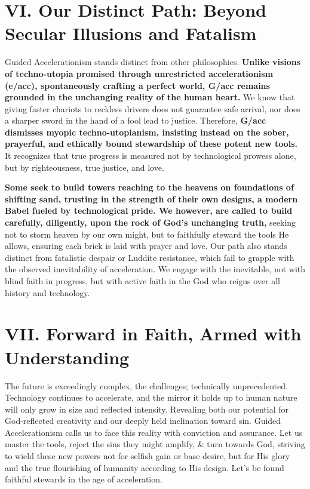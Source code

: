 \documentclass[11pt]{article}
\begin{document}
\section*{VI. Our Distinct Path: Beyond Secular Illusions and Fatalism}

Guided Accelerationism stands distinct from other philosophies. \textbf{Unlike visions of techno-utopia promised through unrestricted accelerationism (e/acc), spontaneously crafting a perfect world, G/acc remains grounded in the unchanging reality of the human heart.} We know that giving faster chariots to reckless drivers does not guarantee safe arrival, nor does a sharper sword in the hand of a fool lead to justice. Therefore, \textbf{G/acc dismisses myopic techno-utopianism, insisting instead on the sober, prayerful, and ethically bound stewardship of these potent new tools.} It recognizes that true progress is measured not by technological prowess alone, but by righteousness, true justice, and love.

\textbf{Some seek to build towers reaching to the heavens on foundations of shifting sand, trusting in the strength of their own designs, a modern Babel fueled by technological pride. We however, are called to build carefully, diligently, upon the rock of God's unchanging truth,} seeking not to storm heaven by our own might, but to faithfully steward the tools He allows, ensuring each brick is laid with prayer and love. Our path also stands distinct from fatalistic despair or Luddite resistance, which fail to grapple with the observed inevitability of acceleration. We engage with the inevitable, not with blind faith in progress, but with active faith in the God who reigns over all history and technology.

\section*{VII. Forward in Faith, Armed with Understanding}

The future is exceedingly complex, the challenges; technically unprecedented. Technology continues to accelerate, and the mirror it holds up to human nature will only grow in size and reflected intensity. Revealing both our potential for God-reflected creativity and our deeply held inclination toward sin. Guided Accelerationism calls us to face this reality with conviction and assurance. Let us master the tools, reject the sins they might amplify, \& turn towards God, striving to wield these new powers not for selfish gain or base desire, but for His glory and the true flourishing of humanity according to His design. Let's be found faithful stewards in the age of acceleration.

\end{document}

